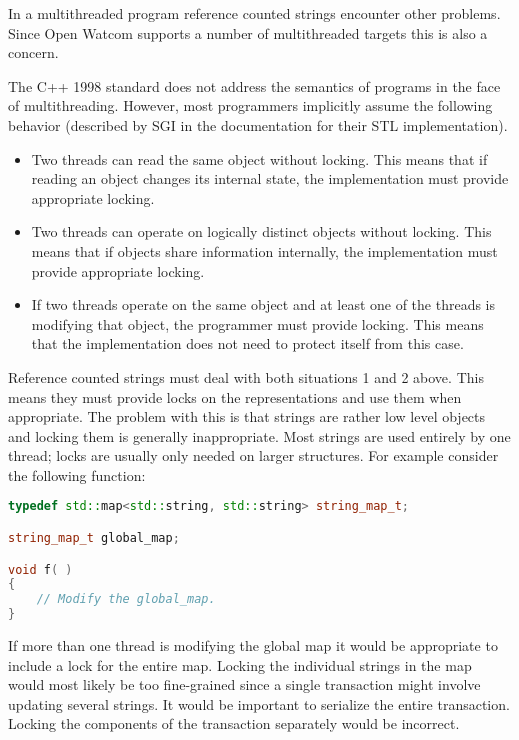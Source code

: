 In a multithreaded program reference counted strings encounter other problems.
Since Open Watcom supports a number of multithreaded targets this is also a
concern.

The C++ 1998 standard does not address the semantics of programs in the face of
multithreading. However, most programmers implicitly assume the following
behavior (described by SGI in the documentation for their STL implementation).

\begin{itemize}
\item Two threads can read the same object without locking. This means that if
reading an object changes its internal state, the implementation must provide
appropriate locking.
\item Two threads can operate on logically distinct objects without locking.
This means that if objects share information internally, the implementation
must provide appropriate locking.
\item If two threads operate on the same object and at least one of the
threads is modifying that object, the programmer must provide locking. This
means that the implementation does not need to protect itself from this case.
\end{itemize}


Reference counted strings must deal with both situations 1 and 2 above. This
means they must provide locks on the representations and use them when
appropriate. The problem with this is that strings are rather low level
objects and locking them is generally inappropriate. Most strings are used
entirely by one thread; locks are usually only needed on larger structures.
For example consider the following function:

\begin{lstlisting}[language=C++]
typedef std::map<std::string, std::string> string_map_t;

string_map_t global_map;

void f( )
{
    // Modify the global_map.
}
\end{lstlisting}

If more than one thread is modifying the global map it would be appropriate to
include a lock for the entire map. Locking the individual strings in the map
would most likely be too fine-grained since a single transaction might involve
updating several strings. It would be important to serialize the entire
transaction. Locking the components of the transaction separately would be
incorrect.

